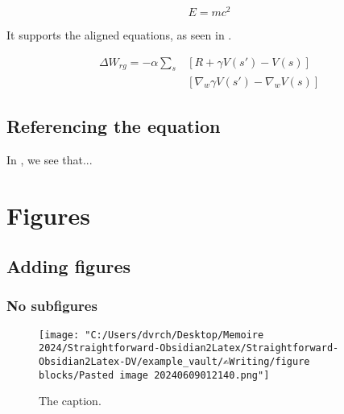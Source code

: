 \begin{equation} \label{eq:Einstein}
	E=mc^{2}
\end{equation}





It supports the aligned equations, as seen in .




\begin{equation}\label{eq:1}
\begin{aligned}
\Delta W_{rg} = -\alpha \sum_{s}&[R+\gamma V(s')-V(s)]  \\
&[\nabla_{w} \gamma V(s')-\nabla_{w}V(s)]
\end{aligned}
\end{equation}



\subsection{Referencing the equation}

In , we see that...

\section{Figures}

\subsection{Adding figures}

\subsubsection{No subfigures}


\begin{figure}[htb]
\centering
\texttt{[image: "C:/Users/dvrch/Desktop/Memoire 2024/Straightforward-Obsidian2Latex/Straightforward-Obsidian2Latex-DV/example\_vault/✍Writing/figure blocks/Pasted image 20240609012140.png"]}
\caption[]{The caption.}

\label{fig:gradient_steps}
\end{figure}




